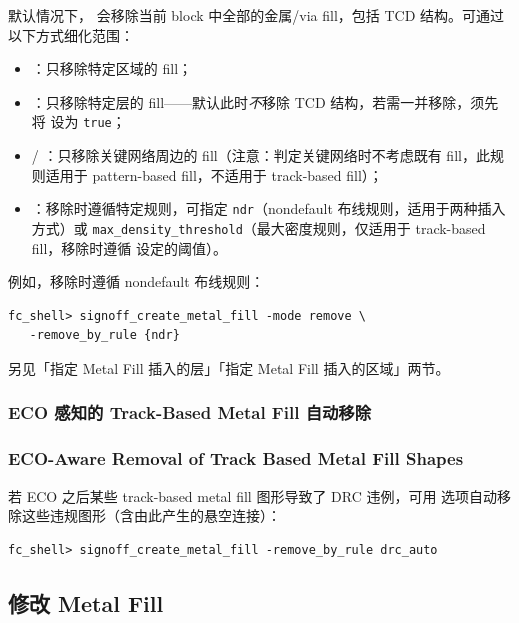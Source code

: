 默认情况下， 会移除当前 block 中全部的金属/via fill，包括 TCD 结构。可通过以下方式细化范围：
\begin{itemize}
  \item {}：只移除特定区域的 fill；
  \item {}：只移除特定层的 fill——默认此时\emph{不}移除 TCD 结构，若需一并移除，须先将  设为 \texttt{true}；
  \item {} / ：只移除关键网络周边的 fill（注意：判定关键网络时不考虑既有 fill，此规则适用于 pattern-based fill，不适用于 track-based fill）；
  \item {}：移除时遵循特定规则，可指定 \texttt{ndr}（nondefault 布线规则，适用于两种插入方式）或 \texttt{max\_density\_threshold}（最大密度规则，仅适用于 track-based fill，移除时遵循  设定的阈值）。
\end{itemize}

例如，移除时遵循 nondefault 布线规则：

\begin{lstlisting}
fc_shell> signoff_create_metal_fill -mode remove \
   -remove_by_rule {ndr}
\end{lstlisting}

\begin{seeAlsoBox}
另见「指定 Metal Fill 插入的层」「指定 Metal Fill 插入的区域」两节。
\end{seeAlsoBox}

\subsubsection{ECO 感知的 Track-Based Metal Fill 自动移除}
\subsubsection*{ECO-Aware Removal of Track Based Metal Fill Shapes}

若 ECO 之后某些 track-based metal fill 图形导致了 DRC 违例，可用  选项自动移除这些违规图形（含由此产生的悬空连接）：

\begin{lstlisting}
fc_shell> signoff_create_metal_fill -remove_by_rule drc_auto
\end{lstlisting}

\subsection{修改 Metal Fill}
